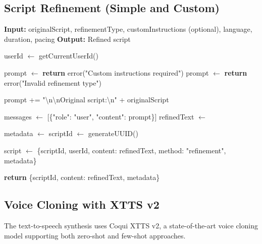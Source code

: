 \subsection{Script Refinement (Simple and Custom)}

\begin{algorithm}[H]
\caption{Script Refinement Process}
\begin{algorithmic}[1]
\State \textbf{Input:} originalScript, refinementType, customInstructions (optional), language, duration, pacing
\State \textbf{Output:} Refined script

    \State userId $\gets$ getCurrentUserId()
    
        \State prompt $\gets$ 
            \State \textbf{return} error("Custom instructions required")
        \EndIf
        \State prompt $\gets$ 
    \Else
        \State \textbf{return} error("Invalid refinement type")
    \EndIf
    
    \State prompt += "\textbackslash n\textbackslash nOriginal script:\textbackslash n" + originalScript
    
    \State messages $\gets$ [\{"role": "user", "content": prompt\}]
    \State refinedText $\gets$ 
    
    \State metadata $\gets$ 
    \State scriptId $\gets$ generateUUID()
    
    \State script $\gets$ \{scriptId, userId, content: refinedText, method: "refinement", metadata\}
    \State {}
    
    \State \textbf{return} \{scriptId, content: refinedText, metadata\}
\EndProcedure
\end{algorithmic}
\end{algorithm}

\subsection{Voice Cloning with XTTS v2}

The text-to-speech synthesis uses Coqui XTTS v2, a state-of-the-art voice cloning model supporting both zero-shot and few-shot approaches.

